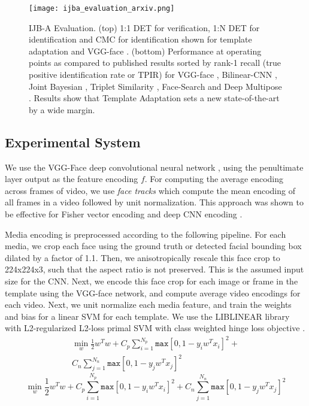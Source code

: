 \documentclass[10pt,twocolumn,letterpaper]{article}
\theoremstyle{definition}		\newtheorem{defn}[thm]{Definition}
\newcommand{\figwidth}{6.85in}
\newcommand{\ARXIV}{}
\begin{document}
\ifdefined\ARXIV
\begin{figure*}[t]
\begin{centering}
\texttt{[image: ijba\_evaluation\_arxiv.png]} 
\caption{IJB-A Evaluation.  (top) 1:1 DET for verification, 1:N DET for identification and CMC for identification shown for template adaptation and VGG-face \cite{Parkhi15}.  (bottom) Performance at operating points as compared to published results sorted by rank-1 recall (true positive identification rate or TPIR) for VGG-face \cite{Parkhi15}, Bilinear-CNN \cite{RoyChowdry16}, Joint Bayesian \cite{Sankaranarayanan16}, Triplet Similarity \cite{Chen16}, Face-Search \cite{Wang15} and Deep Multipose \cite{AbdAlmageed16}.  Results show that Template Adaptation sets a new state-of-the-art by a wide margin.}
\label{f:ijba_evaluation}
\end{centering}
\end{figure*}
 \fi

\subsection{Experimental System}
\label{ss:experimental_system}
We use the VGG-Face deep convolutional neural network \cite{Parkhi15}, using the penultimate layer output as the feature encoding $f$.  
For computing the average encoding across frames of video, we use {\em face tracks} which compute the mean encoding of all frames in a video followed by unit normalization.  This approach was shown to be effective for Fisher vector encoding  \cite{Parkhi14} and 
deep CNN encoding \cite{Parkhi15}. 

Media encoding is preprocessed according to the following pipeline.  
For each media, we crop each face using the ground truth or detected facial bounding box dilated by a factor of 1.1.  Then, we anisotropically rescale this face crop to 224x224x3, such that the aspect ratio is not preserved.  This is the assumed input size for the CNN.  Next, we encode this face crop for each image or frame in the template using the VGG-face network, and compute average video encodings for each video.  Next, we unit normalize each media feature, and train the weights and bias for a linear SVM for each template.  We use the LIBLINEAR library with L2-regularized L2-loss primal SVM with class weighted hinge loss objective  \cite{Fan08}.  
\ifdefined\ARXIV  \begin{equation}
\begin{split}
\min_{w} \frac{1}{2}w^Tw + C_p \sum_{i=1}^{N_p} \mathtt{max} [0, 1-y_iw^Tx_i]^2 + \\ C_{n} \sum_{j=1}^{N_{n}} \mathtt{max} [0, 1-y_j w^Tx_j]^2  
\label{e:loss}
\end{split}
\end{equation}
\else  \begin{equation}
\min_{w} \frac{1}{2}w^Tw + C_p \sum_{i=1}^{N_p} \mathtt{max} [0, 1-y_iw^Tx_i]^2 + C_{n} \sum_{j=1}^{N_{n}} \mathtt{max} [0, 1-y_j w^Tx_j]^2  
\label{e:loss}
\end{equation}
\fi
\end{document}
